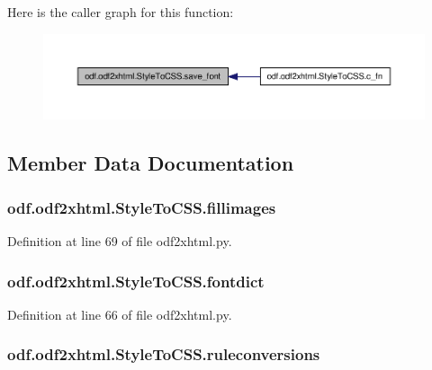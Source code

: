Here is the caller graph for this function\+:
\nopagebreak
\begin{figure}[H]
\begin{center}
\leavevmode
\includegraphics[width=350pt]{classodf_1_1odf2xhtml_1_1StyleToCSS_ade04405816e9c1910d3c838da3268e8f_icgraph}
\end{center}
\end{figure}




\subsection{Member Data Documentation}
\hypertarget{classodf_1_1odf2xhtml_1_1StyleToCSS_a8b624e6ed4d31d0e947239db1036e92c}{
\subsubsection[{fillimages}]{\setlength{\rightskip}{0pt plus 5cm}odf.\+odf2xhtml.\+Style\+To\+C\+S\+S.\+fillimages}}\label{classodf_1_1odf2xhtml_1_1StyleToCSS_a8b624e6ed4d31d0e947239db1036e92c}


Definition at line 69 of file odf2xhtml.\+py.

\hypertarget{classodf_1_1odf2xhtml_1_1StyleToCSS_abbf3b4ba96b5c3192a4fe55b768a0445}{
\subsubsection[{fontdict}]{\setlength{\rightskip}{0pt plus 5cm}odf.\+odf2xhtml.\+Style\+To\+C\+S\+S.\+fontdict}}\label{classodf_1_1odf2xhtml_1_1StyleToCSS_abbf3b4ba96b5c3192a4fe55b768a0445}


Definition at line 66 of file odf2xhtml.\+py.

\hypertarget{classodf_1_1odf2xhtml_1_1StyleToCSS_a99d05d82ffecc1e04e1c9363db5ac14f}{
\subsubsection[{ruleconversions}]{\setlength{\rightskip}{0pt plus 5cm}odf.\+odf2xhtml.\+Style\+To\+C\+S\+S.\+ruleconversions}}\label{classodf_1_1odf2xhtml_1_1StyleToCSS_a99d05d82ffecc1e04e1c9363db5ac14f}


